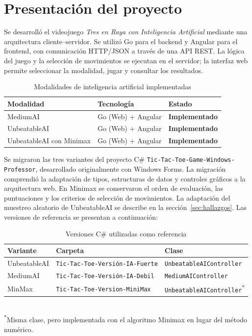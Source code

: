 \documentclass[12pt,a4paper]{article}
\begin{document}
\section{Presentación del proyecto}
Se desarrolló el videojuego \emph{Tres en Raya con Inteligencia Artificial}
mediante una arquitectura cliente--servidor. Se utilizó Go para el backend y
Angular para el frontend, con comunicación HTTP/JSON a través de una API REST.
La lógica del juego y la selección de movimientos se ejecutan en el servidor;
la interfaz web permite seleccionar la modalidad, jugar y consultar los resultados.

\begin{table}[H]
\centering
\caption{Modalidades de inteligencia artificial implementadas}
\begin{tabular}{lll}
\toprule
\textbf{Modalidad} & \textbf{Tecnología} & \textbf{Estado}\\
\midrule
MediumAI & Go (Web) + Angular & \textbf{Implementado}\\
UnbeatableAI & Go (Web) + Angular & \textbf{Implementado}\\
UnbeatableAI con Minimax & Go (Web) + Angular & \textbf{Implementado}\\
\bottomrule
\end{tabular}
\end{table}

Se migraron las tres variantes del proyecto C\#
\texttt{Tic-Tac-Toe-Game-Windows-Professor}, desarrollado originalmente con
Windows Forms. La migración comprendió la adaptación de tipos, estructuras de
datos y controles gráficos a la arquitectura web. En Minimax se conservaron el
orden de evaluación, las puntuaciones y los criterios de selección de movimientos.
La adaptación del muestreo aleatorio de UnbeatableAI se describe en la
sección~\ref{sec:hallazgos}. Las versiones de referencia se presentan a continuación:

\begin{table}[H]
\centering
\caption{Versiones C\# utilizadas como referencia}
\small
\begin{tabular}{p{2.3cm}p{6.6cm}p{5cm}}
\toprule
\textbf{Variante} & \textbf{Carpeta} & \textbf{Clase}\\
\midrule
UnbeatableAI & \texttt{Tic-Tac-Toe-Versión-IA-Fuerte} & \texttt{UnbeatableAIController}\\
MediumAI & \texttt{Tic-Tac-Toe-Versión-IA-Debil} & \texttt{MediumAIController}\\
MinMax & \texttt{Tic-Tac-Toe-Version-MiniMax} & \texttt{UnbeatableAIController}\textsuperscript{*}\\
\bottomrule
\end{tabular}\\[2pt]
{\footnotesize \textsuperscript{*}Misma clase, pero implementada con el algoritmo Minimax en lugar del método numérico.}
\end{table}
\end{document}
